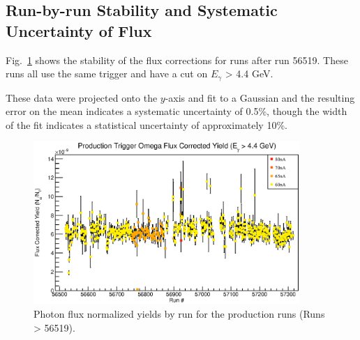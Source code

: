 \subsection{\label{sec:flux.runbyrun}Run-by-run Stability and Systematic Uncertainty of Flux}

Fig.~\ref{gfluxbyrun} shows the stability of the flux corrections for runs after run 56519. These runs all use the same trigger and have a cut on $E_{\gamma}$ > 4.4 GeV. \begin{v2}These data were projected onto the $y$-axis and fit to a Gaussian and the resulting error on the mean indicates a systematic uncertainty of 0.5\%, though the width of the fit indicates a statistical uncertainty of approximately 10\%.\end{v2}

\begin{figure}[htpb]
\begin{center}
 \includegraphics[width=0.9\textwidth]{figures/gflux/gflux_runstability_omega.eps}
  \caption{Photon flux normalized yields by run for the production runs (Runs > 56519).}
  \label{gfluxbyrun}
  \end{center}
\end{figure}

